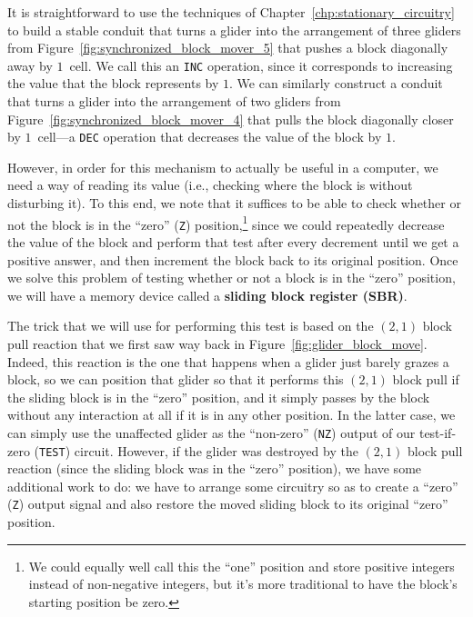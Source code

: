 It is straightforward to use the techniques of Chapter~\ref{chp:stationary_circuitry} to build a stable conduit that turns a glider into the arrangement of three gliders from Figure~\ref{fig:synchronized_block_mover_5} that pushes a block diagonally away by $1$~cell. We call this an \texttt{INC} operation, since it corresponds to increasing the value that the block represents by $1$. We can similarly construct a conduit that turns a glider into the arrangement of two gliders from Figure~\ref{fig:synchronized_block_mover_4} that pulls the block diagonally closer by $1$~cell---a \texttt{DEC} operation that decreases the value of the block by $1$.

However, in order for this mechanism to actually be useful in a computer, we need a way of reading its value (i.e., checking where the block is without disturbing it). To this end, we note that it suffices to be able to check whether or not the block is in the ``zero'' (\texttt{Z}) position,\footnote{We could equally well call this the ``one'' position and store positive integers instead of non-negative integers, but it's more traditional to have the block's starting position be zero.} since we could repeatedly decrease the value of the block and perform that test after every decrement until we get a positive answer, and then increment the block back to its original position. Once we solve this problem of testing whether or not a block is in the ``zero'' position, we will have a memory device called a \textbf{sliding block register (SBR)}.

The trick that we will use for performing this test is based on the $(2,1)$ block pull reaction that we first saw way back in Figure~\ref{fig:glider_block_move}. Indeed, this reaction is the one that happens when a glider just barely grazes a block, so we can position that glider so that it performs this $(2,1)$ block pull if the sliding block is in the ``zero'' position, and it simply passes by the block without any interaction at all if it is in any other position. In the latter case, we can simply use the unaffected glider as the ``non-zero'' (\texttt{NZ}) output of our test-if-zero (\texttt{TEST}) circuit. However, if the glider was destroyed by the $(2,1)$ block pull reaction (since the sliding block was in the ``zero'' position), we have some additional work to do: we have to arrange some circuitry so as to create a ``zero'' (\texttt{Z}) output signal and also restore the moved sliding block to its original ``zero'' position.

